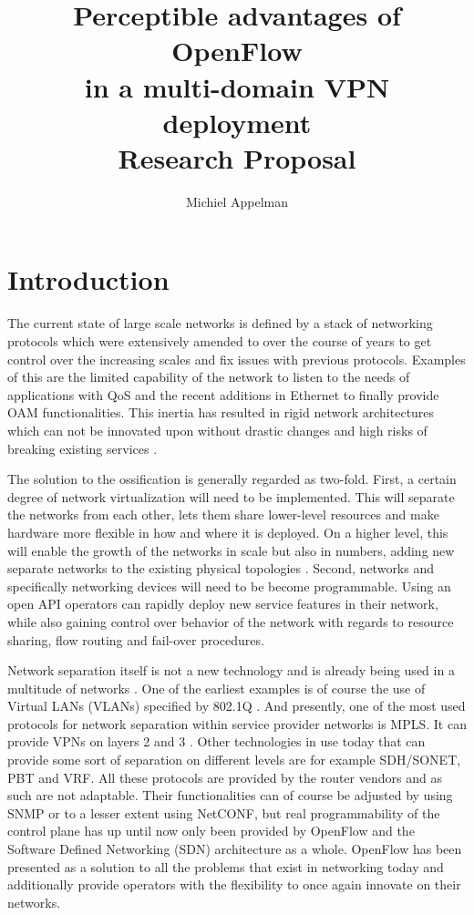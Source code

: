 \documentclass[oneside,twocolumn,8pt,a4paper]{article}
\title{Perceptible advantages of OpenFlow \\
\Large{in a multi-domain VPN deployment} \\[0.3cm]
\large{Research Proposal}}
\author{Michiel Appelman}
\begin{document}
	\maketitle
	
	\section{Introduction} %
	\label{sec:introduction}
	The current state of large scale networks is defined by a stack of networking protocols which were extensively amended to over the course of years to get control over the increasing scales and fix issues with previous protocols. Examples of this are the limited capability of the network to listen to the needs of applications with QoS and the recent additions in Ethernet to finally provide OAM functionalities. This inertia has resulted in rigid network architectures which can not be innovated upon without drastic changes and high risks of breaking existing services \cite{diversifiedinternet,overcomingimpasse}.

	The solution to the ossification is generally regarded as two-fold. First, a certain degree of network virtualization will need to be implemented. This will separate the networks from each other, lets them share lower-level resources and make hardware more flexible in how and where it is deployed. On a higher level, this will enable the growth of the networks in scale but also in numbers, adding new separate networks to the existing physical topologies \cite{diversifying}. Second, networks and specifically networking devices will need to be become programmable. Using an open API operators can rapidly deploy new service features in their network, while also gaining control over behavior of the network with regards to resource sharing, flow routing and fail-over procedures. \cite{programmability-answer}

	Network separation itself is not a new technology and is already being used in a multitude of networks \cite{net-virt10}. One of the earliest examples is of course the use of Virtual LANs (VLANs) specified by 802.1Q \cite{dot1q}. And presently, one of the most used protocols for network separation within service provider networks is MPLS. It can provide VPNs on layers 2 and 3 \cite{rfc4664,rfc4364}. Other technologies in use today that can provide some sort of separation on different levels are for example SDH/SONET, PBT and VRF. All these protocols are provided by the router vendors and as such are not adaptable. Their functionalities can of course be adjusted by using SNMP or to a lesser extent using NetCONF, but real programmability of the control plane has up until now only been provided by OpenFlow \cite{openflow} and the Software Defined Networking (SDN) architecture as a whole. OpenFlow has been presented as a solution to all the problems that exist in networking today and additionally provide operators with the flexibility to once again innovate on their networks.
			
\end{document}
